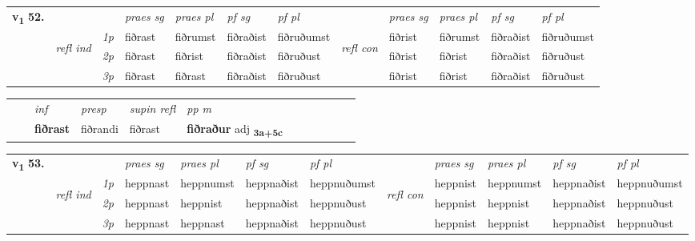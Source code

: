 \begin{tabular}{llllllllllll} \toprule
\multirow{4}{*}{{{\textbf{v{\textsubscript{1}}} \Large{\textbf{52.}}}}}  & &   &  \textit{praes sg}  & \textit{praes pl}  &\textit{pf sg} & \textit{pf pl} &  &  \textit{praes sg}  & \textit{praes pl}  & \textit{pf sg} & \textit{pf pl } \\*
	\cmidrule{4-7} \cmidrule{9-12}
 &\multirow{3}{*}{\begin{turn}{90}\textit{refl ind}\end{turn}} & {\textit{1p}} & fiðrast & fiðrumst    & fiðraðist & fiðruðumst & \multirow{3}{*}{\begin{turn}{90}\textit{refl con}\end{turn}}  &fiðrist & fiðrumst & fiðraðist & fiðruðumst\\*
 &&  {\textit{2p}} &  fiðrast  & fiðrist   & fiðraðist & fiðruðust & &fiðrist & fiðrist & fiðraðist & fiðruðust \\*
& &  {\textit{3p}} & fiðrast & fiðrast   & fiðraðist & fiðruðust & & fiðrist & fiðrist& fiðraðist & fiðruðust  \\*
\cmidrule{4-7} \cmidrule{9-12}
\end{tabular}


\begin{tabular}{llllllllllll}
 & & \textit{inf}     & \textit{presp}  & \textit{supin refl} & \textit{pp m}     \\*
  & & \textbf{fiðrast}      & fiðrandi  & fiðrast & \textbf{fiðraður} adj \textbf{\textsubscript{3a+5c}} \\*
\cmidrule{1-12}
\end{tabular}



\begin{tabular}{llllllllllll} \toprule
\multirow{4}{*}{{{\textbf{v{\textsubscript{1}}} \Large{\textbf{53.}}}}}  & &   &  \textit{praes sg}  & \textit{praes pl}  &\textit{pf sg} & \textit{pf pl} &  &  \textit{praes sg}  & \textit{praes pl}  & \textit{pf sg} & \textit{pf pl } \\*
	\cmidrule{4-7} \cmidrule{9-12}
 &\multirow{3}{*}{\begin{turn}{90}\textit{refl ind}\end{turn}} & {\textit{1p}} & heppnast & heppnumst    & heppnaðist & heppnuðumst & \multirow{3}{*}{\begin{turn}{90}\textit{refl con}\end{turn}}  &heppnist & heppnumst & heppnaðist & heppnuðumst\\*
 &&  {\textit{2p}} &  heppnast  & heppnist   & heppnaðist & heppnuðust & &heppnist & heppnist & heppnaðist & heppnuðust \\*
& &  {\textit{3p}} & heppnast & heppnast   & heppnaðist & heppnuðust & & heppnist & heppnist& heppnaðist & heppnuðust  \\*
\cmidrule{4-7} \cmidrule{9-12}
\end{tabular}


